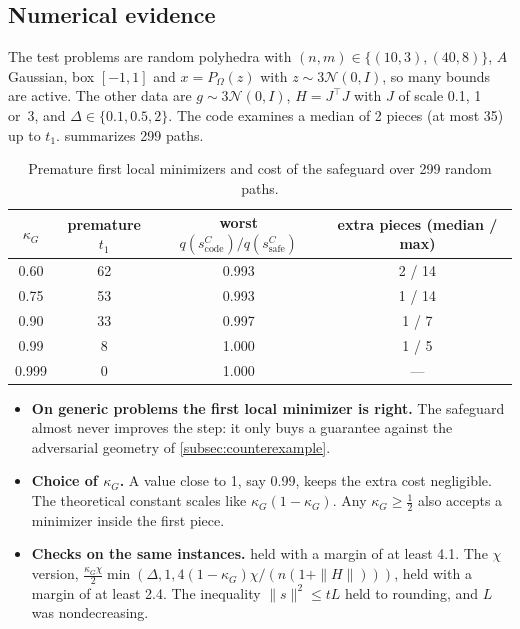 \documentclass[11pt,a4paper]{article}
\numberwithin{equation}{section}
\theoremstyle{plain}
\theoremstyle{definition}
\theoremstyle{remark}
\newcommand{\kG}{\kappa_G}
\begin{document}
\subsection{Numerical evidence}\label{subsec:evidence}

The test problems are random polyhedra with $(n,m)\in\{(10,3),(40,8)\}$, $A$ Gaussian, box
$[-1,1]$ and $x=P_\Omega(z)$ with $z\sim3\mathcal N(0,I)$, so many bounds are active. The other
data are $g\sim3\mathcal N(0,I)$, $H=J^\top J$ with $J$ of scale 0.1, 1 or~3, and
$\Delta\in\{0.1,0.5,2\}$. The code examines a median of 2 pieces (at most 35) up to $t_1$.
 summarizes 299 paths.

\begin{table}[ht]
\centering
\caption{Premature first local minimizers and cost of the safeguard over 299 random paths.}
\label{tab:frequency}
\begin{tabular}{cccc}
\toprule
$\kG$ & premature $t_1$ & worst $q(s^C_{\mathrm{code}})/q(s^C_{\mathrm{safe}})$ & extra pieces (median / max) \\
\midrule
0.60  & 62 & 0.993 & 2 / 14 \\
0.75  & 53 & 0.993 & 1 / 14 \\
0.90  & 33 & 0.997 & 1 / 7 \\
0.99  & 8  & 1.000 & 1 / 5 \\
0.999 & 0  & 1.000 & --- \\
\bottomrule
\end{tabular}
\end{table}

\begin{itemize}
\item \textbf{On generic problems the first local minimizer is right.} The safeguard almost
  never improves the step: it only buys a guarantee against the adversarial geometry of
  \cref{subsec:counterexample}.
\item \textbf{Choice of $\kG$.} A value close to 1, say 0.99, keeps the extra cost negligible.
  The theoretical constant scales like $\kG(1-\kG)$. Any $\kG\ge\frac12$ also accepts a
  minimizer inside the first piece.
\item \textbf{Checks on the same instances.}  held with a margin of
  at least 4.1. The $\chi$ version,
  $\frac{\kG\chi}2\min(\Delta,1,4(1-\kG)\chi/(n(1+\|H\|)))$, held with a margin of at least
  2.4. The inequality $\|s\|^2\le tL$ held to rounding, and $L$ was nondecreasing.
\end{itemize}
\end{document}
